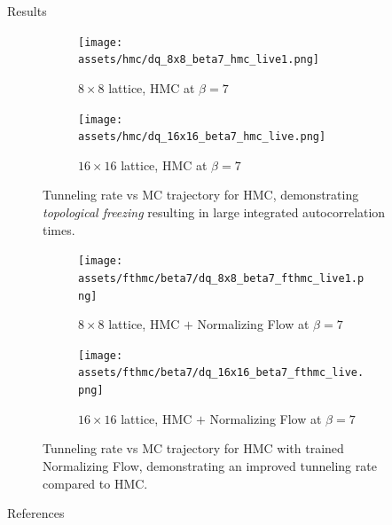 \documentclass[final]{beamer}
\newlength{\sepwidth}
\newlength{\colwidth}
\newcommand{\separatorcolumn}{\begin{column}{\sepwidth}\end{column}}
\begin{document}
\begin{frame}[t]
\begin{columns}[t]
\begin{column}{\colwidth}
  \begin{block}{Results}
    \begin{figure}
      \begin{subfigure}{0.48\columnwidth}
        \centering
        \texttt{[image: assets/hmc/dq\_8x8\_beta7\_hmc\_live1.png]}
        \caption{\label{fig:hmc8beta7}\(8\times8\) lattice, HMC at \(\beta = 7\)}
      \end{subfigure}
      \begin{subfigure}{0.48\columnwidth}
        \centering
        \texttt{[image: assets/hmc/dq\_16x16\_beta7\_hmc\_live.png]}
        \caption{\label{fig:hmc16beta7}\(16\times16\) lattice, HMC at \(\beta = 7\)}
      \end{subfigure}
      \caption{Tunneling rate vs MC trajectory for HMC, demonstrating \emph{topological freezing} resulting in large
      integrated autocorrelation times.}
    \end{figure}
    \begin{figure}
      \begin{subfigure}{0.48\columnwidth}
        \centering
          \texttt{[image: assets/fthmc/beta7/dq\_8x8\_beta7\_fthmc\_live1.png]}
          \caption{\label{fig:fthmc8beta7}\(8\times8\) lattice, HMC \(+\) Normalizing Flow at \(\beta = 7\)}
      \end{subfigure}
      \begin{subfigure}{0.48\columnwidth}
        \centering
        \texttt{[image: assets/fthmc/beta7/dq\_16x16\_beta7\_fthmc\_live.png]}
        \caption{\label{fig:fthmc16beta7}\(16\times16\) lattice, HMC \(+\) Normalizing Flow at \(\beta = 7\)}
      \end{subfigure}
      \caption{Tunneling rate vs MC trajectory for HMC with trained Normalizing Flow, demonstrating an improved
      tunneling rate compared to HMC.}
    \end{figure}
  \end{block}
  \begin{block}{References}
    \nocite{*}
    \footnotesize{}
  \end{block}
\end{column}
\separatorcolumn
\end{columns}
\end{frame}
\end{document}
